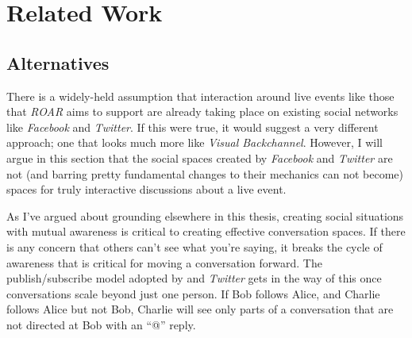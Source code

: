 

\section{Related Work}

%

\subsection{Alternatives}

There is a widely-held assumption that interaction around live events like those that \emph{ROAR} aims to support are already taking place on existing social networks like \emph{Facebook} and \emph{Twitter}. If this were true, it would suggest a very different approach; one that looks much more like \emph{Visual Backchannel}. However, I will argue in this section that the social spaces created by \emph{Facebook} and \emph{Twitter} are not (and barring pretty fundamental changes to their mechanics can not become) spaces for truly interactive discussions about a live event.

As I've argued about grounding elsewhere in this thesis, creating social situations with mutual awareness is critical to creating effective conversation spaces. If there is any concern that others can't see what you're saying, it breaks the cycle of awareness that is critical for moving a conversation forward. The publish/subscribe model adopted by and \emph{Twitter} gets in the way of this once conversations scale beyond just one person. If Bob follows Alice, and Charlie follows Alice but not Bob, Charlie will see only parts of a conversation that are not directed at Bob with an ``@'' reply. 

